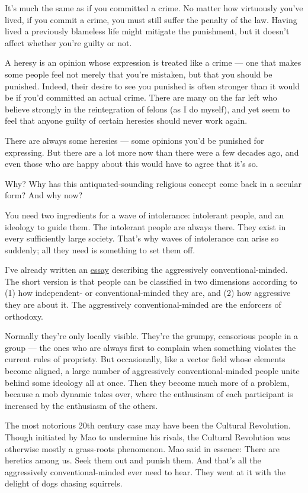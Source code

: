 \documentclass[12pt]{book}
\begin{document}
It's much the same as if you committed a crime. No matter how virtuously
you've lived, if you commit a crime, you must still suffer the penalty
of the law. Having lived a previously blameless life might mitigate the
punishment, but it doesn't affect whether you're guilty or not.

A heresy is an opinion whose expression is treated like a crime --- one
that makes some people feel not merely that you're mistaken, but that
you should be punished. Indeed, their desire to see you punished is
often stronger than it would be if you'd committed an actual crime.
There are many on the far left who believe strongly in the reintegration
of felons (as I do myself), and yet seem to feel that anyone guilty of
certain heresies should never work again.

There are always some heresies --- some opinions you'd be punished for
expressing. But there are a lot more now than there were a few decades
ago, and even those who are happy about this would have to agree that
it's so.

Why? Why has this antiquated-sounding religious concept come back in a
secular form? And why now?

You need two ingredients for a wave of intolerance: intolerant people,
and an ideology to guide them. The intolerant people are always there.
They exist in every sufficiently large society. That's why waves of
intolerance can arise so suddenly; all they need is something to set
them off.

I've already written an \href{conformism.html}{essay} describing the
aggressively conventional-minded. The short version is that people can
be classified in two dimensions according to (1) how independent- or
conventional-minded they are, and (2) how aggressive they are about it.
The aggressively conventional-minded are the enforcers of orthodoxy.

Normally they're only locally visible. They're the grumpy, censorious
people in a group --- the ones who are always first to complain when
something violates the current rules of propriety. But occasionally,
like a vector field whose elements become aligned, a large number of
aggressively conventional-minded people unite behind some ideology all
at once. Then they become much more of a problem, because a mob dynamic
takes over, where the enthusiasm of each participant is increased by the
enthusiasm of the others.

The most notorious 20th century case may have been the Cultural
Revolution. Though initiated by Mao to undermine his rivals, the
Cultural Revolution was otherwise mostly a grass-roots phenomenon. Mao
said in essence: There are heretics among us. Seek them out and punish
them. And that's all the aggressively conventional-minded ever need to
hear. They went at it with the delight of dogs chasing squirrels.
\end{document}
